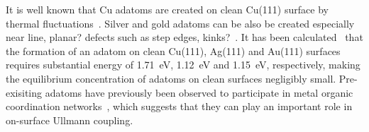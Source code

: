 \documentclass[%
 reprint,
 amsmath,amssymb,
 aps,
prb,
floatfix,
]{revtex4-2}
\newcommand{\comm}{\color{Purple}} %
\begin{document}
{%

It is well known that Cu adatoms are created on clean Cu(111) surface by thermal fluctuations~\cite{ullmann_79, ullmann_58}. Silver and gold adatoms can be also be created especially near {\comm line, planar?} defects such as {\comm step edges, kinks?}~\cite{ullmann_84, ullmann_85}. 
It has been calculated~\cite{chemeurope2017} that the formation of an adatom on clean Cu(111), Ag(111) and Au(111) surfaces requires substantial energy of \SI{1.71}{\electronvolt}, \SI{1.12}{\electronvolt} and \SI{1.15}{\electronvolt}, respectively, making the equilibrium concentration of adatoms on clean surfaces negligibly small.  
Pre-exisiting adatoms have previously been observed to participate in metal organic coordination networks~\cite{ullmann_80, ullmann_81, ullmann_82, ullmann_83}, which suggests that they can play an important role in on-surface Ullmann coupling.


}

\end{document}
